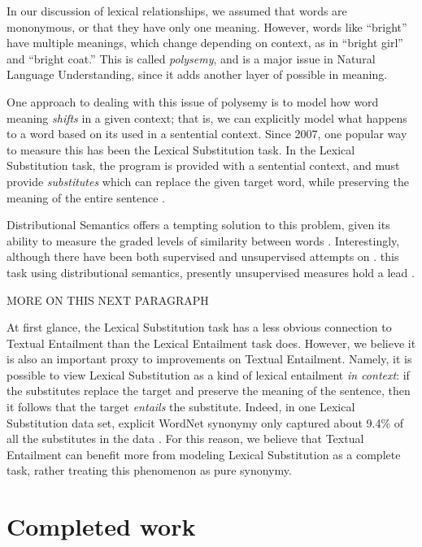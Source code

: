 \documentclass[12pt]{article}
\begin{document}
In our discussion of lexical relationships, we assumed that words are
mononymous, or that they have only one meaning. However, words like ``bright''
have multiple meanings, which change depending on context, as in ``bright
girl'' and ``bright coat.'' This is called {\em polysemy}, and is a major issue
in Natural Language Understanding, since it adds another layer of possible in
meaning.

One approach to dealing with this issue of polysemy is to model how word
meaning {\em shifts} in a given context; that is, we can explicitly model what
happens to a word based on its used in a sentential context. Since 2007, one
popular way to measure this has been the Lexical Substitution task.  In the
Lexical Substitution task, the program is provided with a sentential context,
and must provide {\em substitutes} which can replace the given target word,
while preserving the meaning of the entire sentence
\cite{mccarthy:2007:semeval,biemann:2012:lrec,kremer:2014:eacl}.

Distributional Semantics offers a tempting solution to this problem, given its
ability to measure the graded levels of similarity between words
\cite{erk:2008:emnlp}. Interestingly, although there have been both supervised
\cite{biemann:2012:lrec,szarvas:2013:naacl} and unsupervised attempts on
\cite{erk:2008:emnlp,dinu:2010:emnlp,thater:2010:acl,vandecruys:2011:emnlp,kremer:2014:eacl,melamud:2015:naacl,melamud:2015:vsm,kawakami:2016:iclr,roller:2016:naacl}.
this task using distributional semantics, presently unsupervised measures hold
a lead \cite{melamud:2015:naacl,melamud:2016:conll}.

MORE ON THIS NEXT PARAGRAPH

At first glance, the Lexical Substitution task has a less obvious connection to
Textual Entailment than the Lexical Entailment task does. However, we believe
it is also an important proxy to improvements on Textual Entailment. Namely, it
is possible to view Lexical Substitution as a kind of lexical entailment {\em
in context}: if the substitutes replace the target and preserve the meaning of
the sentence, then it follows that the target {\em entails} the substitute.
Indeed, in one Lexical Substitution data set, explicit WordNet synonymy only
captured about 9.4\% of all the substitutes in the data
\cite{kremer:2014:eacl}. For this reason, we believe that Textual Entailment
can benefit more from modeling Lexical Substitution as a complete task, rather
treating this phenomenon as pure synonymy.

\section{Completed work}
\end{document}
